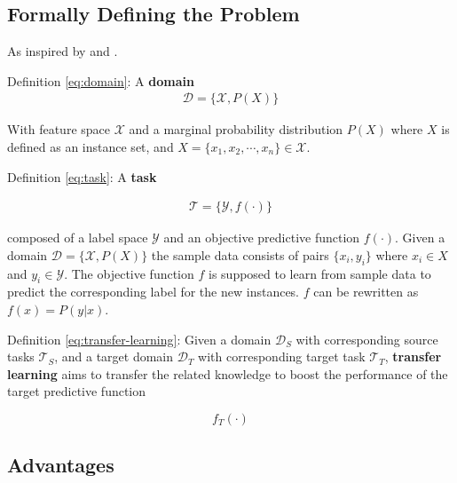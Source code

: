 \documentclass[11pt]{article}
\begin{document}
\subsection{Formally Defining the Problem}

As inspired by \cite{concise-review-of-transfer-learning} and \cite{survey-on-transfer-learning}.

Definition \ref{eq:domain}: A \textbf{domain} \begin{align}
    \mathcal{D} = \{\mathcal{X}, P(X)\}
    \label{eq:domain}
\end{align}

With feature space $\mathcal{X}$ and a marginal probability distribution $P(X)$ where $X$ is defined as an instance set, and $X = \{x_1, x_2, \cdots, x_n\} \in \mathcal{X}$.

\vspace{1em}

Definition \ref{eq:task}: A \textbf{task}

\begin{align}
    \mathcal{T} = \{\mathcal{Y}, f(\cdot)\}
    \label{eq:task}
\end{align}

composed of a label space $\mathcal{Y}$ and an objective predictive function $f(\cdot)$. Given a domain $\mathcal{D} = \{\mathcal{X}, P(X)\}$ the sample data consists of pairs $\{x_i, y_i\}$ where $x_i \in X$ and $y_i \in \mathcal{Y}$. The objective function $f$ is supposed to learn from sample data to predict the corresponding label for the new instances. $f$ can be rewritten as $f(x)=P(y|x)$.

\vspace{1em}

Definition \ref{eq:transfer-learning}: Given a domain $\mathcal{D}_S$ with corresponding source tasks $\mathcal{T}_S$, and a target domain $\mathcal{D}_T$ with corresponding target task $\mathcal{T}_T$, \textbf{transfer learning} aims to transfer the related knowledge to boost the performance of the target predictive function

\begin{equation}
    f_T(\cdot)
    \label{eq:transfer-learning}
\end{equation}

\subsection{Advantages}
\end{document}
